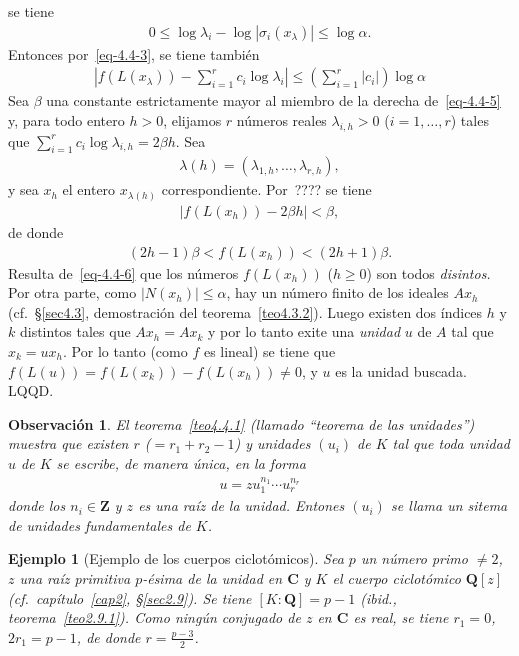 \documentclass[bibtotoc,leqno,spanish]{amsbook}
\newcommand{\QQ}{\mathbf{Q}}
\newcommand{\ZZ}{\mathbf{Z}}
\newcommand{\CC}{\mathbf{C}}
\newcommand{\QED}{LQQD.}
\newcommand{\abs}[1]{\left\lvert#1\right\rvert}
\numberwithin{equation}{section}
\theoremstyle{note}
\theoremstyle{note}
\theoremstyle{rem}
\newtheorem*{example*}{Ejemplo}
\newtheorem*{remark*}{Observaci\'on}
\numberwithin{theorem}{section}
\numberwithin{proposition}{section}
\numberwithin{definition}{section}
\numberwithin{lemma}{section}
\numberwithin{corollary}{section}
\numberwithin{example}{section}
\numberwithin{footnote}{section}%
\begin{document}
se tiene
\begin{gather}
0\leq\log\lambda_{i}-\log\abs{\sigma_{i}(x_{\lambda})}\leq\log\alpha.
\end{gather}
Entonces por~\eqref{eq-4.4-3}, se tiene tambi\'en
\begin{gather}\label{eq-4.4-5}
\abs{f(L(x_{\lambda}))-\sum_{i=1}^{r}c_{i}\log\lambda_{i}}\leq\left(\sum_{i=1}^{r}\abs{c_{i}}\right)\log\alpha
\end{gather}
Sea $\beta$ una constante estrictamente mayor al miembro de la derecha de~\eqref{eq-4.4-5} y, para todo entero $h>0$,
elijamos $r$ n\'umeros reales $\lambda_{i,h}>0$ ($i=1,\dots,r$) tales que $\sum_{i=1}^{r}c_{i}\log\lambda_{i,h}
=2\beta h$. Sea
\begin{gather*}
\lambda(h)= (\lambda_{1,h},\dots,\lambda_{r,h}),
\end{gather*}
y sea $x_{h}$ el entero $x_{\lambda(h)}$ correspondiente. Por~???? se tiene
\begin{gather*}
\abs{f(L(x_{h}))-2\beta h} < \beta,
\end{gather*}
de donde
\begin{gather}\label{eq-4.4-6}
(2h-1)\beta < f(L(x_{h})) < (2h+1)\beta.
\end{gather}
Resulta de~\eqref{eq-4.4-6} que los n\'umeros $f(L(x_{h}))$ ($h\geq 0$) son todos {\em disintos.} Por otra parte,
como $\abs{N(x_{h})}\leq\alpha$, hay un n\'umero finito de los ideales $Ax_{h}$ (cf.~\S\ref{sec4.3}, demostraci\'on
del teorema~\ref{teo4.3.2}). Luego existen dos \'indices $h$ y $k$ distintos tales que $Ax_{h}=Ax_{k}$ y por lo tanto
exite una {\em unidad} $u$ de $A$ tal que $x_{k} = ux_{h}$. Por lo tanto (como $f$ es lineal) se tiene que
$f(L(u)) = f(L(x_{k})) - f(L(x_{h})) \neq 0$, y $u$ es la unidad buscada. \QED

\begin{remark*}
El teorema~\ref{teo4.4.1} (llamado ``teorema de las unidades'') muestra que existen $r$ ($=r_{1}+r_{2}-1$) y unidades $(u_{i})$
de $K$ tal que toda unidad $u$ de $K$ se escribe, de manera \'unica, en la forma
\begin{gather}
u = zu_{1}^{n_{1}}\cdots u_{r}^{n_{r}}
\end{gather}
donde los $n_{i}\in\ZZ$ y $z$ es una ra\'iz de la unidad. Entones $(u_{i})$ se llama un {\em sitema de unidades
fundamentales} de $K$.
\end{remark*}

\begin{example*}[Ejemplo de los cuerpos ciclot\'omicos]
Sea $p$ un n\'umero primo $\neq 2$, $z$ una
ra\'iz primitiva $p$-\'esima de la unidad en $\CC$ y $K$ el cuerpo ciclot\'omico $\QQ[z]$
(cf.~cap\'itulo~\ref{cap2}, \S\ref{sec2.9}). Se tiene $[K:\QQ] = p-1$ ({\itshape ibid.}, teorema~\ref{teo2.9.1}). Como ning\'un conjugado de
$z$ en $\CC$ es real, se tiene $r_{1}=0$, $2r_{1} = p-1$, de donde $r = \frac{p-3}{2}$.
\end{example*}
\end{document}
